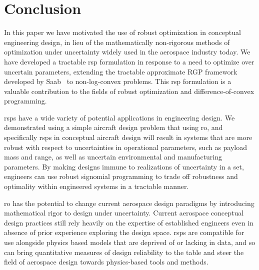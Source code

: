 \section{Conclusion}

In this paper we have motivated the use of robust optimization in conceptual engineering
design, in lieu of the mathematically non-rigorous methods of optimization under uncertainty
widely used in the aerospace industry today. We have developed a tractable \gls{rsp} formulation
in response to a need to optimize over uncertain parameters, extending
the tractable approximate RGP framework developed by Saab~\cite{Saab2018} to non-log-convex problems.
This \gls{rsp} formulation is a valuable contribution to the fields of robust
optimization and difference-of-convex programming.

\gls{rsp}s have a wide variety of potential applications in engineering design.
We demonstrated using a simple aircraft design problem
that using \gls{ro}, and specifically \gls{rsp}s in conceptual aircraft design will result in systems
that are more robust with respect to uncertainties in operational parameters,
such as payload mass and range, as well as uncertain environmental and manufacturing parameters.
By making designs immune to realizations of uncertainty in a set, engineers can use
robust signomial programming to trade off
robustness and optimality within engineered systems in a tractable manner.

\gls{ro} has
the potential to change current aerospace design paradigms by introducing
mathematical rigor to design under uncertainty. Current aerospace
conceptual design practices still rely heavily on the expertise of established
engineers even in absence of prior experience exploring the design space.
\gls{rsp}s are compatible for use alongside physics based models
that are deprived of or lacking in data, and so can bring quantitative
measures of design reliability to the table and
steer the field of aerospace design towards physics-based tools and methods.
